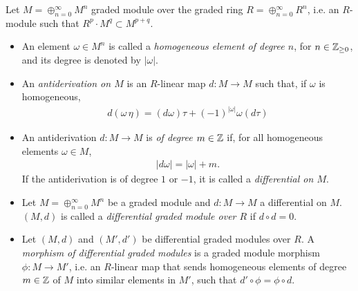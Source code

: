 \begin{definition}\label{defnDiffGModule}
    Let $M = \oplus_{n = 0}^\infty M^n$ graded module over the graded ring $R = \oplus_{n = 0}^\infty R^n$, i.e. an $R$-module such that $R^p \cdot M^q \subset M^{p+q}$.
    
    \begin{itemize}
    
    \item An element $\omega \in M^n$ is called a \emph{homogeneous element of degree $n$}, for $n \in \mathbb{Z}_{\geq 0}$, and its degree is denoted by $|\omega|$.
    
    \item An \emph{antiderivation on $M$} is an $R$-linear map $d: M \to M$ such that, if $\omega$ is homogeneous, 
    \begin{align*}
        d(\omega \, \eta) = (d\omega)\tau + (-1)^{|\omega|} \omega (d\tau)
    \end{align*}
    
    \item An antiderivation $d: M \to M$ is \emph{of degree $m \in \mathbb{Z}$} if, for all homogeneous elements $\omega \in M$,
    \begin{align*}
        |d\omega| = |\omega| + m.
    \end{align*}
    If the antiderivation is of degree $1$ or $-1$, it is called a \emph{differential on $M$}.
    
    \item Let $M = \oplus_{n = 0}^\infty M^n$ be a graded module and $d: M \to M$ a differential on $M$. $(M, d)$ is called a \emph{differential graded module over $R$} if $d \circ d = 0$.
    
    \item Let $(M, d)$ and $(M', d')$ be differential graded modules over $R$. A \emph{morphism of differential graded modules} is a graded module morphism $\phi: M \to M'$, i.e. an $R$-linear map that sends homogeneous elements of degree $m \in \mathbb{Z}$ of $M$ into similar elements in $M'$, such that $d' \circ \phi = \phi \circ d$.
    
    \end{itemize}
    
\end{definition}

